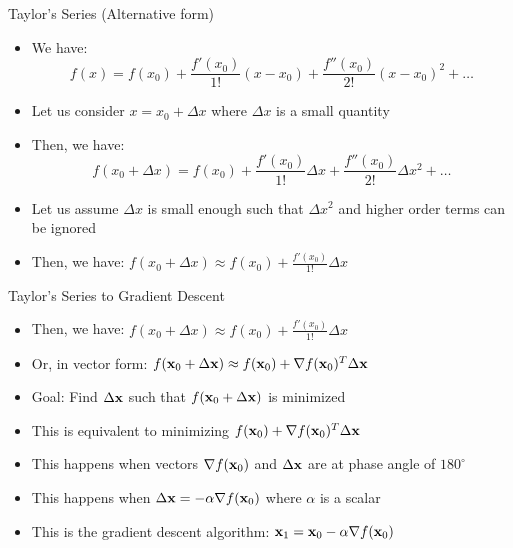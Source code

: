 \documentclass[usenames,dvipsnames]{beamer}
\begin{document}
  \begin{frame}{Taylor's Series (Alternative form)}
    \begin{itemize}[<+->]
    \item We have:
        \begin{equation}
            f(x) = f(x_0) + \frac{f'(x_0)}{1!}(x-x_0) + \frac{f''(x_0)}{2!}(x-x_0)^2 + \ldots
        \end{equation}
    \item Let us consider $x = x_0 + \Delta x$ where $\Delta x$ is a small quantity
    \item Then, we have:
    \begin{equation}
        f(x_0 + \Delta x) = f(x_0) + \frac{f'(x_0)}{1!}\Delta x + \frac{f''(x_0)}{2!}\Delta x^2 + \ldots
    \end{equation} 
    \item Let us assume $\Delta x$ is small enough such that $\Delta x^2$ and higher order terms can be ignored
    \item Then, we have:
    $f(x_0 + \Delta x) \approx f(x_0) + \frac{f'(x_0)}{1!}\Delta x$
    \end{itemize}


	

	
  \end{frame}

  \begin{frame}{Taylor's Series  to Gradient Descent}
    \begin{itemize}[<+->]
    \item Then, we have:
    $f(x_0 + \Delta x) \approx f(x_0) + \frac{f'(x_0)}{1!}\Delta x$
    \item Or, in vector form:
    $f(\mathbf{x}_0 + \Delta \mathbf{x}) \approx f(\mathbf{x}_0) + \nabla f(\mathbf{x}_0)^T\Delta \mathbf{x}$
    \item Goal: Find $\Delta \mathbf{x}$ such that $f(\mathbf{x}_0 + \Delta \mathbf{x})$ is minimized
    \item This is equivalent to minimizing $f(\mathbf{x}_0) + \nabla f(\mathbf{x}_0)^T\Delta \mathbf{x}$
    \item This happens when vectors $\nabla f(\mathbf{x}_0)$ and $\Delta \mathbf{x}$ are at phase angle of $180^{\circ}$
    \item This happens when $\Delta \mathbf{x} = -\alpha \nabla f(\mathbf{x}_0)$ where $\alpha$ is a scalar
    \item This is the gradient descent algorithm: $\mathbf{x}_1 = \mathbf{x}_0 - \alpha \nabla f(\mathbf{x}_0)$
\end{itemize}
  \end{frame}
\end{document}
